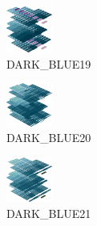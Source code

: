 \hspace{0.1cm}
\begin{minipage}[b]{0.15\linewidth}
\begin{figure}[H]                                                          
  \centering                                                             
  \begin{adjustbox}{width=1.5cm,center}                                   
  \includegraphics[width=1.5cm]{src/colorspace_colourflow/flows/colourflow_163-45.png}%
  \end{adjustbox}                                                        
\caption*{DARK\_BLUE19}                                           
\end{figure}                                                               
\end{minipage}
\hspace{0.1cm}
\begin{minipage}[b]{0.15\linewidth}
\begin{figure}[H]                                                          
  \centering                                                             
  \begin{adjustbox}{width=1.5cm,center}                                   
  \includegraphics[width=1.5cm]{src/colorspace_colourflow/flows/colourflow_164-45.png}%
  \end{adjustbox}                                                        
\caption*{DARK\_BLUE20}                                           
\end{figure}                                                               
\end{minipage}
\hspace{0.1cm}
\begin{minipage}[b]{0.15\linewidth}
\begin{figure}[H]                                                          
  \centering                                                             
  \begin{adjustbox}{width=1.5cm,center}                                   
  \includegraphics[width=1.5cm]{src/colorspace_colourflow/flows/colourflow_165-45.png}%
  \end{adjustbox}                                                        
\caption*{DARK\_BLUE21}                                           
\end{figure}                                                               
\end{minipage}
